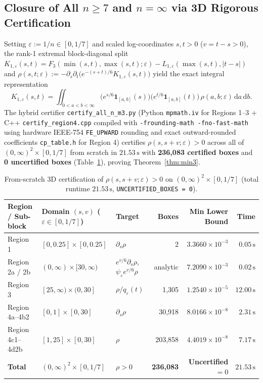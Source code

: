\documentclass[11pt,a4paper]{article}
\theoremstyle{remark}
\begin{document}
\subsection{Closure of All $n\ge 7$ and $n=\infty$ via 3D Rigorous Certification}
Setting $\varepsilon := 1/n \in [0,1/7]$ and scaled log-coordinates $s,t>0$ ($v=t-s>0$), the rank-1 extremal block-diagonal split $K_{1,\varepsilon}(s,t) = F_3(\min(s,t),\max(s,t);\varepsilon) - L_{1,\varepsilon}(\max(s,t),|t-s|)$ and $\rho(s,t;\varepsilon) := -\partial_s\partial_t\big(e^{-(s+t)/6}K_{1,\varepsilon}(s,t)\big)$ yield the exact integral representation
\[
K_{1,\varepsilon}(s,t) = \iint_{0<a<b<\infty} \Big(e^{s/6}\mathbf{1}_{[a,b]}(s)\Big)\Big(e^{t/6}\mathbf{1}_{[a,b]}(t)\Big)\,\rho(a,b;\varepsilon)\,\mathrm{d}a\,\mathrm{d}b.
\]
The hybrid certifier \texttt{certify\_all\_n\_m3.py} (Python \texttt{mpmath.iv} for Regions 1--3 + C++ \texttt{certify\_region4.cpp} compiled with \texttt{-frounding-math -fno-fast-math} using hardware IEEE-754 \texttt{FE\_UPWARD} rounding and exact outward-rounded coefficients \texttt{cp\_table.h} for Region 4) certifies $\rho(s,s+v;\varepsilon)>0$ across all of $(0,\infty)^2\times[0,1/7]$ from scratch in \textbf{$21.53\,\mathrm{s}$} with \textbf{236,083 certified boxes} and \textbf{0 uncertified boxes} (Table~\ref{tab:3d_cert}), proving Theorem~\ref{thm:min3}.

\begin{table}[!htbp]
\centering
\caption{From-scratch 3D certification of $\rho(s,s+v;\varepsilon)>0$ on $(0,\infty)^2\times[0,1/7]$ (total runtime $21.53\,\mathrm{s}$, \texttt{UNCERTIFIED\_BOXES = 0}).}
\label{tab:3d_cert}
\begin{tabularx}{\linewidth}{lXlrrr}
\toprule
Region / Sub-block & Domain $(s,v)$ ($\varepsilon\in[0,1/7]$) & Target & Boxes & Min Lower Bound & Time \\
\midrule
Region 1 & $[0,0.25]\times[0,0.25]$ & $\partial_s\rho$ & 2 & $3.3660\times 10^{-3}$ & $0.05\,\mathrm{s}$ \\
Region 2a / 2b & $(0,\infty)\times[30,\infty)$ & $e^{v/6}\partial_s\rho$, $\psi_\varepsilon e^{v/6}\rho$ & analytic & $7.2090\times 10^{-3}$ & $0.02\,\mathrm{s}$ \\
Region 3 & $[25,\infty)\times(0,30]$ & $\rho/q_\varepsilon(t)$ & 1,305 & $1.2540\times 10^{-5}$ & $12.00\,\mathrm{s}$ \\
Region 4a--4b2 & $[0,1]\times[0,30]$ & $\partial_s\rho$ & 30,918 & $8.0166\times 10^{-8}$ & $2.31\,\mathrm{s}$ \\
Region 4c1--4d2b & $[1,25]\times[0,30]$ & $\rho$ & 203,858 & $4.4019\times 10^{-8}$ & $7.17\,\mathrm{s}$ \\
\midrule
\textbf{Total} & \textbf{$(0,\infty)^2\times[0,1/7]$} & \textbf{$\rho > 0$} & \textbf{236,083} & \textbf{Uncertified $= 0$} & \textbf{$21.53\,\mathrm{s}$} \\
\bottomrule
\end{tabularx}
\end{table}
\end{document}
